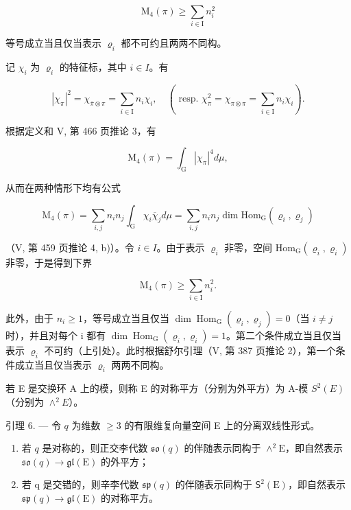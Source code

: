 \[
\mathrm{M} _ {4} (\pi) \geqslant \sum_ {i \in \mathrm{I}} n _ {i} ^ {2}
\]

等号成立当且仅当表示 \(\varrho_{i}\) 都不可约且两两不同构。

记 \(\chi_{i}\) 为 \(\varrho_{i}\) 的特征标，其中 \(i\in I\)。有

\[
| \chi_ {\pi} | ^ {2} = \chi_ {\overline {{\pi}} \otimes \pi} = \sum_ {i \in \mathrm{I}} n _ {i} \chi_ {i}, \quad (\text { resp. } \chi_ {\pi} ^ {2} = \chi_ {\pi \otimes \pi} = \sum_ {i \in \mathrm{I}} n _ {i} \chi_ {i}).
\]

根据定义和 V, 第 466 页推论 3，有

\[
\mathrm{M} _ {4} (\pi) = \int_ {\mathrm{G}} | \chi_ {\pi} | ^ {4} d \mu ,
\]

从而在两种情形下均有公式

\[
\mathrm{M} _ {4} (\pi) = \sum_ {i, j} n _ {i} n _ {j} \int_ {\mathrm{G}} \chi_ {i} \overline {{\chi}} _ {j} d \mu = \sum_ {i, j} n _ {i} n _ {j} \dim \mathrm{Hom} _ {\mathrm{G}} (\varrho_ {i}, \varrho_ {j})
\]

（V, 第 459 页推论 4, b)）。令 \(i \in I\)。由于表示 \(\varrho_{i}\) 非零，空间 \(\mathrm{Hom}_{\mathrm{G}}(\varrho_{i}, \varrho_{i})\) 非零，于是得到下界

\[
\mathrm{M} _ {4} (\pi) \geqslant \sum_ {i \in \mathrm{I}} n _ {i} ^ {2}.
\]

此外，由于 \(n_{i} \geqslant 1\)，等号成立当且仅当 \(\dim \operatorname{Hom}_{\mathrm{G}}(\varrho_{i}, \varrho_{j}) = 0\)（当 \(i \neq j\) 时），并且对每个 i 都有 \(\dim \operatorname{Hom}_{\mathrm{G}}(\varrho_{i}, \varrho_{i}) = 1\)。第二个条件成立当且仅当表示 \(\varrho_{i}\) 不可约（上引处）。此时根据舒尔引理（V, 第 387 页推论 2），第一个条件成立当且仅当表示 \(\varrho_{i}\) 两两不同构。

若 E 是交换环 A 上的模，则称 E 的对称平方（分别为外平方）为 A-模 \(S^{2}(E)\)（分别为 \(\wedge^{2}E\)）。

引理 6. --- 令 \(q\) 为维数 \(\geqslant 3\) 的有限维复向量空间 E 上的分离双线性形式。

\begin{enumerate}
\def\labelenumi{\alph{enumi})}
\item
  若 \(q\) 是对称的，则正交李代数 \(\mathfrak{so}(q)\) 的伴随表示同构于 \(\wedge^2\mathrm{E}\)，即自然表示 \(\mathfrak{so}(q) \to \mathfrak{gl}(\mathrm{E})\) 的外平方；
\item
  若 q 是交错的，则辛李代数 \(\mathfrak{sp}(q)\) 的伴随表示同构于 \(\mathsf{S}^2 (\mathrm{E})\)，即自然表示 \(\mathfrak{sp}(q)\to \mathfrak{gl}(\mathrm{E})\) 的对称平方。
\end{enumerate}

